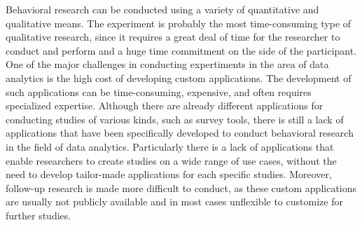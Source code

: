 Behavioral research can be conducted using a variety of quantitative and qualitative means. The experiment is probably the most time-consuming type of qualitative research, since it requires a great deal of time for the researcher to conduct and perform and a huge time commitment on the side of the participant. One of the major challenges in conducting expertiments in the area of data analytics is the high cost of developing custom applications. The development of such applications can be time-consuming, expensive, and often requires specialized expertise. Although there are already different applications for conducting studies of various kinds, such as survey tools, there is still a lack of applications that have been specifically developed to conduct behavioral research in the field of data analytics. Particularly there is a lack of applications that enable researchers to create studies on a wide range of use cases, without the need to develop tailor-made applications for each specific studies. %
Moreover, follow-up research is made more difficult to conduct, as these custom applications are usually not publicly available and in most cases unflexible to customize for further studies. %
